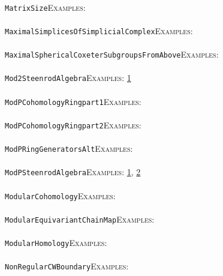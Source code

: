 \documentclass[a4paper,11pt]{report}
\begin{document}
{{ \\
 \texttt{MatrixSize}{\nobreakspace}{\nobreakspace}{\nobreakspace}{\nobreakspace}\textsc{Examples:} \\
 \\
 \texttt{MaximalSimplicesOfSimplicialComplex}{\nobreakspace}{\nobreakspace}{\nobreakspace}{\nobreakspace}\textsc{Examples:} \\
 \\
 \texttt{MaximalSphericalCoxeterSubgroupsFromAbove}{\nobreakspace}{\nobreakspace}{\nobreakspace}{\nobreakspace}\textsc{Examples:} \\
 \\
 \texttt{Mod2SteenrodAlgebra}{\nobreakspace}{\nobreakspace}{\nobreakspace}{\nobreakspace}\textsc{Examples:} \href{../www/SideLinks/About/aboutModPRings.html} {1}{\nobreakspace} \\
 \\
 \texttt{ModPCohomologyRing{\textunderscore}part{\textunderscore}1}{\nobreakspace}{\nobreakspace}{\nobreakspace}{\nobreakspace}\textsc{Examples:} \\
 \\
 \texttt{ModPCohomologyRing{\textunderscore}part{\textunderscore}2}{\nobreakspace}{\nobreakspace}{\nobreakspace}{\nobreakspace}\textsc{Examples:} \\
 \\
 \texttt{ModPRingGeneratorsAlt}{\nobreakspace}{\nobreakspace}{\nobreakspace}{\nobreakspace}\textsc{Examples:} \\
 \\
 \texttt{ModPSteenrodAlgebra}{\nobreakspace}{\nobreakspace}{\nobreakspace}{\nobreakspace}\textsc{Examples:} \href{tutorial/chap7.html} {1}{\nobreakspace}, \href{../www/SideLinks/About/aboutModPRings.html} {2}{\nobreakspace} \\
 \\
 \texttt{ModularCohomology}{\nobreakspace}{\nobreakspace}{\nobreakspace}{\nobreakspace}\textsc{Examples:} \\
 \\
 \texttt{ModularEquivariantChainMap}{\nobreakspace}{\nobreakspace}{\nobreakspace}{\nobreakspace}\textsc{Examples:} \\
 \\
 \texttt{ModularHomology}{\nobreakspace}{\nobreakspace}{\nobreakspace}{\nobreakspace}\textsc{Examples:} \\
 \\
 \texttt{NonRegularCWBoundary}{\nobreakspace}{\nobreakspace}{\nobreakspace}{\nobreakspace}\textsc{Examples:} \\
}}
\end{document}
